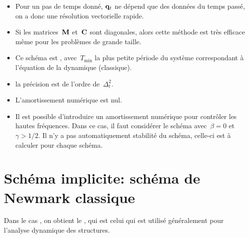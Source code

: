 \begin{itemize}
  \item Pour un pas de temps donné, $\VV{q}_t$ ne dépend que des données du temps passé,
	on a donc une résolution vectorielle rapide.
  \item Si les matrices~$\MM{M}$ et~$\MM{C}$ sont diagonales, alors cette méthode est très efficace
	même pour les problèmes de grande taille.
  \item Ce schéma est ,
	avec~$T_{\min}$ la plus petite période du système correspondant à l'équation
	de la dynamique (classique).
  \item la précision est de l'ordre de~$\Delta_t^2$.
  \item L'amortissement numérique est nul.
  \item Il est possible d'introduire un amortissement numérique pour contrôler les hautes
	fréquences. Dans ce cas, il faut considérer le schéma avec~$\beta=0$ et~$\gamma>1/2$.
	Il n'y a pas automatiquement stabilité du schéma, celle-ci est à calculer pour chaque
	schéma.
\end{itemize}
\bigskip
\section{Schéma implicite: schéma de Newmark classique}

Dans le cas , on obtient le ,
qui est celui qui est utilisé généralement pour l'analyse dynamique des structures.

